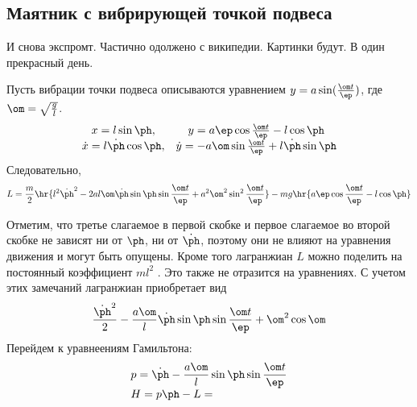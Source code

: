 \documentclass[a4paper,12pt]{article}
\begin{document}
\subsection{Маятник с вибрирующей точкой подвеса}
\begin{petit}
  И снова экспромт.  Частично одолжено с википедии.
  Картинки будут. В один прекрасный день.
\end{petit}
Пусть вибрации точки подвеса описываются уравнением $y =
a\sin(\frac{\om t}{\ep})$, где $\om = \sqrt\frac{g}{l}$.
\newcommand{\hzz}{\frac{\om t}{\ep}}
\begin{displaymath}
  \begin{array}{cc}
    x = l \sin\ph,&  y = a\ep\cos\hzz -  l\cos\ph\\
    \dot x = l \dot\ph\cos\ph,& \dot y  =  -a\om\sin\hzz + l\dot\ph\sin\ph
  \end{array}
\end{displaymath}
Следовательно,
\begin{displaymath}
  L = \frac{m}{2}\hr{l^2{\dot\ph}^2 - 2al\om\dot\ph\sin\ph\sin\hzz + a^2\om^2\sin^2\hzz} - mg\hr{a\ep\cos\hzz - l\cos\ph}
\end{displaymath}

Отметим, что третье слагаемое в первой скобке и первое слагаемое во
второй скобке не зависят ни от $\ph$, ни от $\dot\ph$, поэтому они не
влияют на уравнения движения и могут быть опущены. Кроме того
лагранжиан $L$ можно поделить на постоянный коэффициент $ml^2$ . Это
также не отразится на уравнениях. С учетом этих замечаний лагранжиан
приобретает вид
\begin{displaymath}
  \frac{{\dot\ph}^2}{2} - \frac{a\om}{l}\dot\ph\sin\ph\sin\hzz + \om^2\cos\om
\end{displaymath}
Перейдем к уравнеениям Гамильтона:
\tbk
\begin{displaymath}
  \begin{array}{l}
    \displaystyle
    p = \dot\ph - \frac{a\om}{l}\sin\ph\sin\hzz\\
    H = p\ph - L =
  \end{array}
\end{displaymath}
\end{document}
